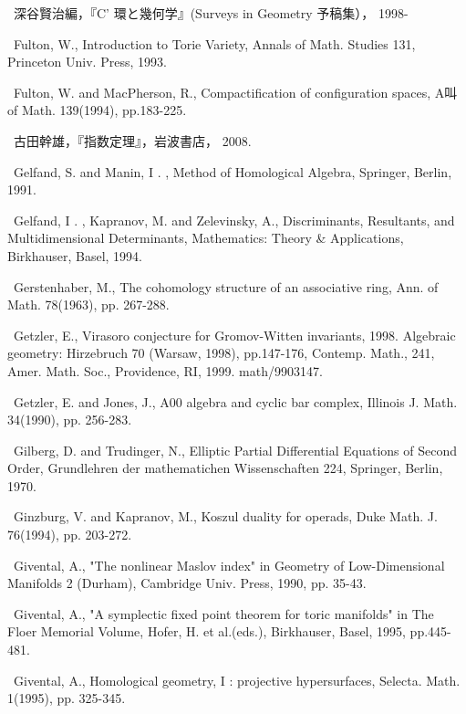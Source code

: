 {\noindent [132]\ 深谷賢治編，『C' 環と幾何学』(Surveys in Geometry 予稿集）， 1998-\par\smallskip
\noindent [133]\ Fulton, W., Introduction to Torie Variety, Annals of Math. Studies 131, Princeton Univ. Press, 1993.\par\smallskip
\noindent [134]\ Fulton, W. and MacPherson, R., Compactification of configuration spaces, A叫 of Math. 139(1994), pp.183-225.\par\smallskip
\noindent [135]\ 古田幹雄，『指数定理』，岩波書店， 2008.\par\smallskip
\noindent [136]\ Gelfand, S. and Manin, I . , Method of Homological Algebra, Springer, Berlin, 1991.\par\smallskip
\noindent [137]\ Gelfand, I . , Kapranov, M. and Zelevinsky, A., Discriminants, Resultants, and Multidimensional Determinants, Mathematics: Theory \& Applications, Birkhauser, Basel, 1994.\par\smallskip
\noindent [138]\ Gerstenhaber, M., The cohomology structure of an associative ring, Ann. of Math. 78(1963), pp. 267-288.\par\smallskip
\noindent [139]\ Getzler, E., Virasoro conjecture for Gromov-Witten invariants, 1998. Algebraic geometry: Hirzebruch 70 (Warsaw, 1998), pp.147-176, Contemp. Math., 241, Amer. Math. Soc., Providence, RI, 1999. math/9903147.\par\smallskip
\noindent [140]\ Getzler, E. and Jones, J., A00 algebra and cyclic bar complex, Illinois J. Math. 34(1990), pp. 256-283.\par\smallskip
\noindent [141]\ Gilberg, D. and Trudinger, N., Elliptic Partial Differential Equations of Second Order, Grundlehren der mathematichen Wissenschaften 224, Springer, Berlin, 1970.\par\smallskip
\noindent [142]\ Ginzburg, V. and Kapranov, M., Koszul duality for operads, Duke Math. J. 76(1994), pp. 203-272.\par\smallskip
\noindent [143]\ Givental, A., "The nonlinear Maslov index" in Geometry of Low-Dimensional Manifolds 2 (Durham), Cambridge Univ. Press, 1990, pp. 35-43.\par\smallskip
\noindent [144]\ Givental, A., "A symplectic fixed point theorem for toric manifolds" in The Floer Memorial Volume, Hofer, H. et al.(eds.), Birkhauser, Basel, 1995, pp.445-481.\par\smallskip
\noindent [145]\ Givental, A., Homological geometry, I : projective hypersurfaces, Selecta. Math. 1(1995), pp. 325-345.\par\smallskip
}
